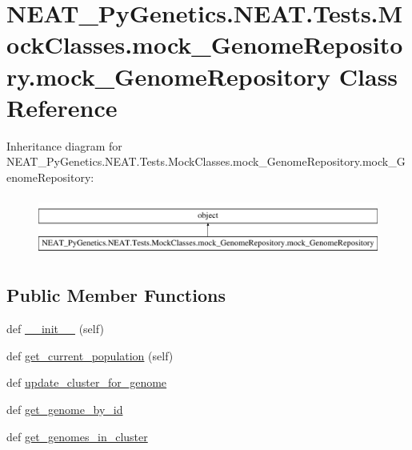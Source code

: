 \hypertarget{classNEAT__PyGenetics_1_1NEAT_1_1Tests_1_1MockClasses_1_1mock__GenomeRepository_1_1mock__GenomeRepository}{}\section{N\+E\+A\+T\+\_\+\+Py\+Genetics.\+N\+E\+A\+T.\+Tests.\+Mock\+Classes.\+mock\+\_\+\+Genome\+Repository.\+mock\+\_\+\+Genome\+Repository Class Reference}
\label{classNEAT__PyGenetics_1_1NEAT_1_1Tests_1_1MockClasses_1_1mock__GenomeRepository_1_1mock__GenomeRepository}
Inheritance diagram for N\+E\+A\+T\+\_\+\+Py\+Genetics.\+N\+E\+A\+T.\+Tests.\+Mock\+Classes.\+mock\+\_\+\+Genome\+Repository.\+mock\+\_\+\+Genome\+Repository\+:\begin{figure}[H]
\begin{center}
\leavevmode
\includegraphics[height=1.982301cm]{classNEAT__PyGenetics_1_1NEAT_1_1Tests_1_1MockClasses_1_1mock__GenomeRepository_1_1mock__GenomeRepository}
\end{center}
\end{figure}
\subsection*{Public Member Functions}
\begin{DoxyCompactItemize}
\item 
def \hyperlink{classNEAT__PyGenetics_1_1NEAT_1_1Tests_1_1MockClasses_1_1mock__GenomeRepository_1_1mock__GenomeRepository_a1b6913e42019740f0dd683eef2bf8f32}{\+\_\+\+\_\+init\+\_\+\+\_\+} (self)
\item 
def \hyperlink{classNEAT__PyGenetics_1_1NEAT_1_1Tests_1_1MockClasses_1_1mock__GenomeRepository_1_1mock__GenomeRepository_ad5413865b1a0a82964e0046d59406383}{get\+\_\+current\+\_\+population} (self)
\item 
def \hyperlink{classNEAT__PyGenetics_1_1NEAT_1_1Tests_1_1MockClasses_1_1mock__GenomeRepository_1_1mock__GenomeRepository_a3d3a5d43fa4285aa6282557fef12f471}{update\+\_\+cluster\+\_\+for\+\_\+genome}
\item 
def \hyperlink{classNEAT__PyGenetics_1_1NEAT_1_1Tests_1_1MockClasses_1_1mock__GenomeRepository_1_1mock__GenomeRepository_aab8cb8b23202bf0a41e3dcbf42c096b0}{get\+\_\+genome\+\_\+by\+\_\+id}
\item 
def \hyperlink{classNEAT__PyGenetics_1_1NEAT_1_1Tests_1_1MockClasses_1_1mock__GenomeRepository_1_1mock__GenomeRepository_a5abad1601614b0c128b4ab64e41ecba8}{get\+\_\+genomes\+\_\+in\+\_\+cluster}
\end{DoxyCompactItemize}
